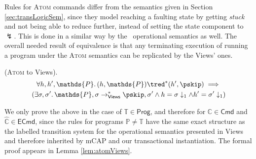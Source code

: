 Rules for \textsc{Atom} commands differ from the semantics given in Section \ref{sec:transLogicSem}, since they model reaching a faulting state by getting \textit{stuck} and not being able to reduce further, instead of setting the state component to $\lightning$. This is done in a similar way by the \tpl\ operational semantics as well. The overall needed result of equivalence is that any terminating execution of running a program under the \textsc{Atom} semantics can be replicated by the Views' ones.

\begin{thm}
	\label{thm:atomViewsProg}
	(\textsc{Atom} to Views).
	\begin{gather*}
		\forall h, h', \mathds{P} \ldotp
		(h, \mathds{P}) \tred^* (h', \pskip)
		\implies \\
		\left(		
			\exists \sigma, \sigma' \ldotp
			\mathds{P}, \sigma \rightarrow^*_{\mathsf{Views}} \pskip, \sigma'
			\land h = \sigma \downarrow_1 \land h' = \sigma' \downarrow_1
		\right)
	\end{gather*}
\end{thm}

We only prove the above in the case of $\mathds{T} \in \mathsf{Prog}$, and therefore for $\mathds{C} \in \mathsf{Cmd}$ and $\hat{\mathds{C}} \in \mathsf{ECmd}$, since the rules for programs $\mathds{P} \neq \mathds{T}$ have the same exact structure as the labelled transition system for the operational semantics presented in Views and therefore inherited by mCAP and our transactional instantiation. The formal proof appears in Lemma \ref{lem:atomViews}.